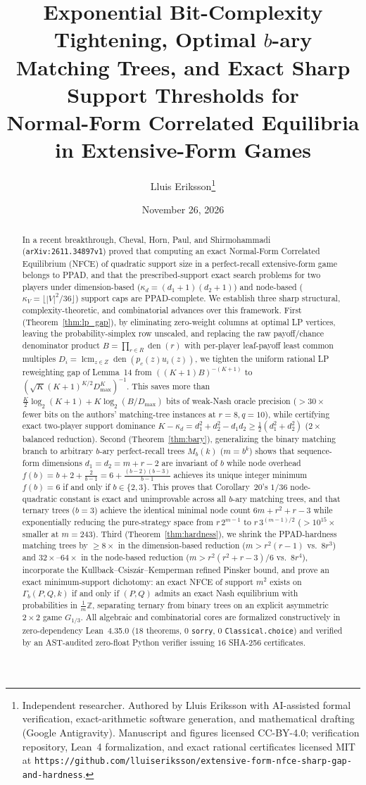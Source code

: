 \documentclass[11pt,a4paper]{article}
\title{\textbf{Exponential Bit-Complexity Tightening, Optimal \texorpdfstring{$b$}{b}-ary\\
Matching Trees, and Exact Sharp Support Thresholds for\\
Normal-Form Correlated Equilibria in Extensive-Form Games}}
\author{Lluis Eriksson\thanks{Independent researcher. Authored by Lluis Eriksson with AI-assisted formal verification, exact-arithmetic software generation, and mathematical drafting (Google Antigravity). Manuscript and figures licensed CC-BY-4.0; verification repository, Lean~4 formalization, and exact rational certificates licensed MIT at \nolinkurl{https://github.com/lluiseriksson/extensive-form-nfce-sharp-gap-and-hardness}.}}
\date{November 26, 2026}
\theoremstyle{remark}
\newcommand{\lcm}{\operatorname{lcm}}
\newcommand{\den}{\operatorname{den}}
\newcommand{\Z}{\mathbb{Z}}
\begin{document}
\maketitle

\begin{abstract}
In a recent breakthrough, Cheval, Horn, Paul, and Shirmohammadi (\nolinkurl{arXiv:2611.34897v1}) proved that computing an exact Normal-Form Correlated Equilibrium (NFCE) of quadratic support size in a perfect-recall extensive-form game belongs to PPAD, and that the prescribed-support exact search problems for two players under dimension-based ($\kappa_d = (d_1+1)(d_2+1)$) and node-based ($\kappa_V = \lfloor |V|^2/36 \rfloor$) support caps are PPAD-complete. We establish three sharp structural, complexity-theoretic, and combinatorial advances over this framework.
First (Theorem~\ref{thm:lp_gap}), by eliminating zero-weight columns at optimal LP vertices, leaving the probability-simplex row unscaled, and replacing the raw payoff/chance denominator product $B = \prod_{r\in R}\den(r)$ with per-player leaf-payoff least common multiples $D_i = \lcm_{z\in Z}\den(p_c(z)u_i(z))$, we tighten the uniform rational LP reweighting gap of Lemma~14 from $((K+1)B)^{-(K+1)}$ to $(\sqrt{K}(K+1)^{K/2}D_{\max}^K)^{-1}$. This saves more than $\frac{K}{2}\log_2(K+1) + K\log_2(B/D_{\max})$ bits of weak-Nash oracle precision ($>30\times$ fewer bits on the authors' matching-tree instances at $r=8, q=10$), while certifying exact two-player support dominance $K - \kappa_d = d_1^2 + d_2^2 - d_1 d_2 \ge \frac{1}{2}(d_1^2 + d_2^2)$ ($2\times$ balanced reduction).
Second (Theorem~\ref{thm:bary}), generalizing the binary matching branch to arbitrary $b$-ary perfect-recall trees $M_b(k)$ ($m = b^k$) shows that sequence-form dimensions $d_1 = d_2 = m + r - 2$ are invariant of $b$ while node overhead $f(b) = b + 2 + \frac{2}{b-1} = 6 + \frac{(b-2)(b-3)}{b-1}$ achieves its unique integer minimum $f(b) = 6$ if and only if $b \in \{2, 3\}$. This proves that Corollary~20's $1/36$ node-quadratic constant is exact and unimprovable across all $b$-ary matching trees, and that ternary trees ($b=3$) achieve the identical minimal node count $6m + r^2 + r - 3$ while exponentially reducing the pure-strategy space from $r\,2^{m-1}$ to $r\,3^{(m-1)/2}$ ($>10^{15}\times$ smaller at $m=243$).
Third (Theorem~\ref{thm:hardness}), we shrink the PPAD-hardness matching trees by $\ge 8\times$ in the dimension-based reduction ($m > r^2(r-1)$ vs.\ $8r^3$) and $32\times$--$64\times$ in the node-based reduction ($m > r^2(r^2+r-3)/6$ vs.\ $8r^4$), incorporate the Kullback--Csisz\'ar--Kemperman refined Pinsker bound, and prove an exact minimum-support dichotomy: an exact NFCE of support $m^2$ exists on $\Gamma_b(P,Q,k)$ if and only if $(P,Q)$ admits an exact Nash equilibrium with probabilities in $\frac{1}{m}\Z$, separating ternary from binary trees on an explicit asymmetric $2{\times}2$ game $G_{1/3}$. All algebraic and combinatorial cores are formalized constructively in zero-dependency Lean~4.35.0 ($18$ theorems, $0$ \texttt{sorry}, $0$ \texttt{Classical.choice}) and verified by an AST-audited zero-float Python verifier issuing $16$ SHA-256 certificates.
\end{abstract}
\end{document}
